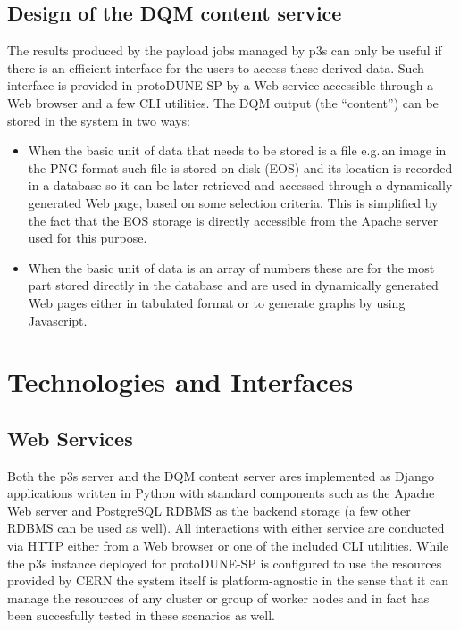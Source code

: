 \documentclass{webofc}
\newcommand{\pd}{protoDUNE\xspace}
\begin{document}
\subsection{Design of the DQM content service}
The results produced by the payload jobs managed by p3s can only be useful if there is an
efficient interface for the users to access these derived data. Such interface is provided in \pd-SP
by a Web service accessible through a Web browser and a few CLI utilities.
The DQM output (the ``content'') can be stored in the system in two ways:
\begin{itemize}

\item When the basic unit of data that needs to be stored is a file e.g.\,an image in the PNG format such
file is stored on disk (EOS) and its location is recorded in a database so it can be later retrieved
and accessed through a dynamically generated Web page,  based on some selection criteria.
This is simplified by the fact that the EOS storage is directly accessible from the Apache server
used for this purpose.

\item When the basic unit of data is an array of numbers these are for the most part stored directly
in the database and are used in dynamically generated Web pages either in tabulated format or
to generate graphs by using Javascript.

\end{itemize}



\section{Technologies and Interfaces}
\subsection{Web Services}

Both the p3s server and the DQM content server ares implemented as Django
\cite{django} applications written in Python with standard components such
as the Apache Web server and PostgreSQL RDBMS as the backend storage
(a few other RDBMS can be used as well). All interactions with either service
are conducted via HTTP either from a Web browser or one of the included CLI utilities.
While the p3s instance deployed for \pd-SP is configured to use
the resources provided by CERN the system itself is platform-agnostic in the sense that
it can manage the resources of any cluster or group of worker nodes and in fact has
been succesfully tested in these scenarios as well.
\end{document}

